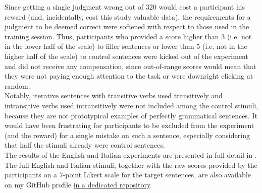 Since getting a single judgment wrong out of 320 would cost a participant his reward (and, incidentally, cost this study valuable data), the requirements for a judgment to be deemed correct were softened with respect to those used in the training session. Thus, participants who provided a score higher than 3 (i.e. not in the lower half of the scale) to filler sentences or lower than 5 (i.e. not in the higher half of the scale) to control sentences were kicked out of the experiment and did not receive any compensation, since out-of-range scores would mean that they were not paying enough attention to the task or were downright clicking at random.\\ Notably, iterative sentences with transitive verbs used transitively and intransitive verbs used intransitively were not included among the control stimuli, because they are not prototypical examples of perfectly grammatical sentences. It would have been frustrating for participants to be excluded from the experiment (and the reward) for a single mistake on such a sentence, especially considering that half the stimuli already were control sentences.\\
The results of the English and Italian experiments are presented in full detail in . The full English and Italian stimuli, together with the raw scores provided by the participants on a 7-point Likert scale for the target sentences, are also available on my GitHub profile \href{https://github.com/giuliacappelli/dissertationData}{in a dedicated repository}.
